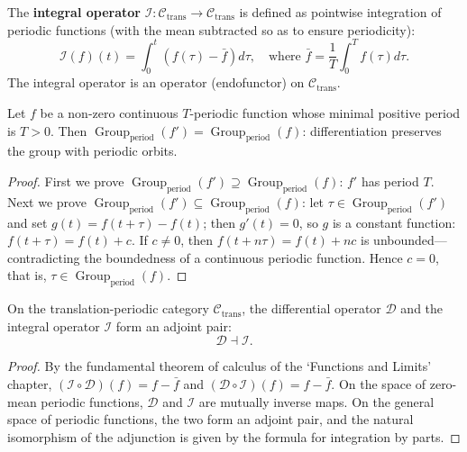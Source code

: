 \begin{definition}\label{def:integral_operator}
The \textbf{integral operator} $\mathcal{I}: \mathcal{C}_{\text{trans}} \to \mathcal{C}_{\text{trans}}$ is defined as pointwise integration of periodic functions (with the mean subtracted so as to ensure periodicity):
\[
\mathcal{I}(f)(t) = \int_0^t (f(\tau) - \bar{f}) d\tau, \quad \text{where } \bar{f} = \frac{1}{T}\int_0^T f(\tau) d\tau.
\]
The integral operator is an operator (endofunctor) on $\mathcal{C}_{\text{trans}}$.
\end{definition}

\begin{lemma}\label{ch13_derivative_period_lemma}
Let $f$ be a non-zero continuous $T$-periodic function whose minimal positive period is $T > 0$. Then $\operatorname{Group}_{\mathrm{period}}(f') = \operatorname{Group}_{\mathrm{period}}(f)$: differentiation preserves the group with periodic orbits.
\end{lemma}

\begin{proof}
First we prove $\operatorname{Group}_{\mathrm{period}}(f') \supseteq \operatorname{Group}_{\mathrm{period}}(f)$: $f'$ has period $T$. Next we prove $\operatorname{Group}_{\mathrm{period}}(f') \subseteq \operatorname{Group}_{\mathrm{period}}(f)$: let $\tau \in \operatorname{Group}_{\mathrm{period}}(f')$ and set $g(t) = f(t+\tau) - f(t)$; then $g'(t) = 0$, so $g$ is a constant function: $f(t+\tau) = f(t) + c$. If $c \neq 0$, then $f(t + n\tau) = f(t) + nc$ is unbounded---contradicting the boundedness of a continuous periodic function. Hence $c = 0$, that is, $\tau \in \operatorname{Group}_{\mathrm{period}}(f)$.
\end{proof}

\begin{theorem}\label{thm:diff_int_adjunction}
On the translation-periodic category $\mathcal{C}_{\text{trans}}$, the differential operator $\mathcal{D}$ and the integral operator $\mathcal{I}$ form an adjoint pair:
\[
\mathcal{D} \dashv \mathcal{I}.
\]
\end{theorem}

\begin{proof}
By the fundamental theorem of calculus of the `Functions and Limits' chapter, $(\mathcal{I} \circ \mathcal{D})(f) = f - \bar{f}$ and $(\mathcal{D} \circ \mathcal{I})(f) = f - \bar{f}$. On the space of zero-mean periodic functions, $\mathcal{D}$ and $\mathcal{I}$ are mutually inverse maps. On the general space of periodic functions, the two form an adjoint pair, and the natural isomorphism of the adjunction is given by the formula for integration by parts.
\end{proof}

